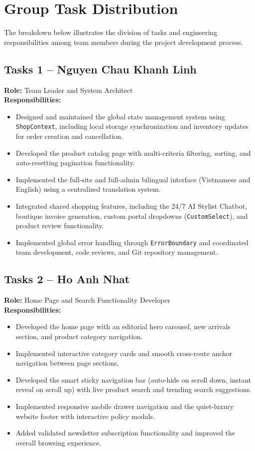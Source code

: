 \documentclass[12pt,a4paper,oneside]{report}
\begin{document}
\section{Group Task Distribution}
The breakdown below illustrates the division of tasks and engineering responsibilities among team members during the project development process.

\subsection{Tasks 1 -- Nguyen Chau Khanh Linh}
\textbf{Role:} Team Leader and System Architect\\
\textbf{Responsibilities:}
\begin{itemize}[leftmargin=1.2cm]
    \item Designed and maintained the global state management system using \texttt{ShopContext}, including local storage synchronization and inventory updates for order creation and cancellation.
    \item Developed the product catalog page with multi-criteria filtering, sorting, and auto-resetting pagination functionality.
    \item Implemented the full-site and full-admin bilingual interface (Vietnamese and English) using a centralized translation system.
    \item Integrated shared shopping features, including the 24/7 AI Stylist Chatbot, boutique invoice generation, custom portal dropdowns (\texttt{CustomSelect}), and product review functionality.
    \item Implemented global error handling through \texttt{ErrorBoundary} and coordinated team development, code reviews, and Git repository management.
\end{itemize}

\subsection{Tasks 2 -- Ho Anh Nhat}
\textbf{Role:} Home Page and Search Functionality Developer\\
\textbf{Responsibilities:}
\begin{itemize}[leftmargin=1.2cm]
    \item Developed the home page with an editorial hero carousel, new arrivals section, and product category navigation.
    \item Implemented interactive category cards and smooth cross-route anchor navigation between page sections.
    \item Developed the smart sticky navigation bar (auto-hide on scroll down, instant reveal on scroll up) with live product search and trending search suggestions.
    \item Implemented responsive mobile drawer navigation and the quiet-luxury website footer with interactive policy modals.
    \item Added validated newsletter subscription functionality and improved the overall browsing experience.
\end{itemize}
\end{document}
